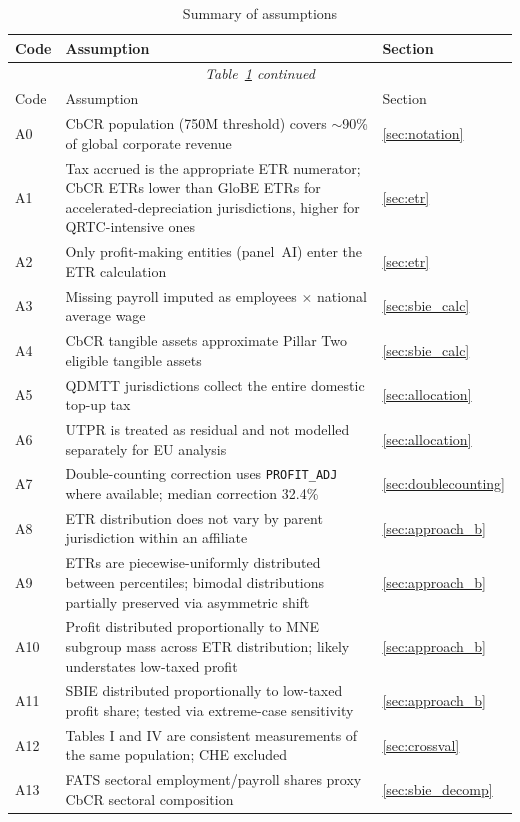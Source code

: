 \documentclass[11pt,a4paper]{article}
\newcommand{\EUR}{\texteuro}
\newcommand{\code}[1]{\texttt{#1}}
\begin{document}
\begin{longtable}{@{}lp{10cm}l@{}}
\caption{Summary of assumptions}\label{tab:assumptions}\\
\toprule
Code & Assumption & Section \\
\midrule
\endfirsthead
\multicolumn{3}{c}{\textit{Table~\ref{tab:assumptions} continued}}\\
\toprule
Code & Assumption & Section \\
\midrule
\endhead
\bottomrule
\endlastfoot
A0 & CbCR population (\EUR750M threshold) covers $\sim$90\% of global corporate revenue & \ref{sec:notation} \\
A1 & Tax accrued is the appropriate ETR numerator; CbCR ETRs lower than GloBE ETRs for accelerated-depreciation jurisdictions, higher for QRTC-intensive ones & \ref{sec:etr} \\
A2 & Only profit-making entities (panel~AI) enter the ETR calculation & \ref{sec:etr} \\
A3 & Missing payroll imputed as employees $\times$ national average wage & \ref{sec:sbie_calc} \\
A4 & CbCR tangible assets approximate Pillar Two eligible tangible assets & \ref{sec:sbie_calc} \\
A5 & QDMTT jurisdictions collect the entire domestic top-up tax & \ref{sec:allocation} \\
A6 & UTPR is treated as residual and not modelled separately for EU analysis & \ref{sec:allocation} \\
A7 & Double-counting correction uses \code{PROFIT\_ADJ} where available; median correction 32.4\% & \ref{sec:doublecounting} \\
A8 & ETR distribution does not vary by parent jurisdiction within an affiliate & \ref{sec:approach_b} \\
A9 & ETRs are piecewise-uniformly distributed between percentiles; bimodal distributions partially preserved via asymmetric shift & \ref{sec:approach_b} \\
A10 & Profit distributed proportionally to MNE subgroup mass across ETR distribution; likely understates low-taxed profit & \ref{sec:approach_b} \\
A11 & SBIE distributed proportionally to low-taxed profit share; tested via extreme-case sensitivity & \ref{sec:approach_b} \\
A12 & Tables I and IV are consistent measurements of the same population; CHE excluded & \ref{sec:crossval} \\
A13 & FATS sectoral employment/payroll shares proxy CbCR sectoral composition & \ref{sec:sbie_decomp} \\

\end{longtable}
\end{document}
